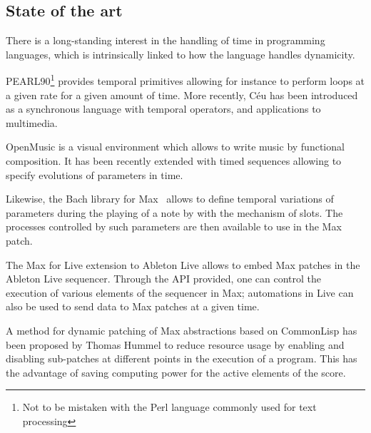 \documentclass[applsci,article,submit,moreauthors,pdftex,10pt,a4paper]{mdpi}
\begin{document}

\subsection{State of the art}

There is a long-standing interest in the handling of time in programming languages, which is intrinsically linked to how the language handles dynamicity.

PEARL90\cite{halang2001safe}\footnote{Not to be mistaken with the Perl language commonly used for text processing} provides temporal primitives allowing for instance to perform loops at a given rate for a given amount of time.
More recently, Céu has been introduced as a synchronous language with temporal operators, and applications to multimedia\cite{Santos:2016:CLI:2976796.2976856}.

OpenMusic is a visual environment which allows to write music by functional composition.
It has been recently extended with timed sequences allowing to specify evolutions of parameters in time\cite{garcia:hal-01484077}.

Likewise, the Bach library for Max~\cite{agostini2015max} allows to define temporal variations of parameters during the playing of a note by with the mechanism of slots.
The processes controlled by such parameters are then available to use in the Max patch.

The Max for Live extension to Ableton Live allows to embed Max patches in the Ableton Live sequencer. 
Through the API provided, one can control the execution of various elements of the sequencer in Max; automations in Live can also be used to send data to Max patches at a given time.

A method for dynamic patching of Max abstractions based on CommonLisp has been proposed by Thomas Hummel\cite{hummel1994common} to reduce resource usage by enabling and disabling sub-patches at different points in the execution of a program.
This has the advantage of saving computing power for the active elements of the score.
\end{document}
